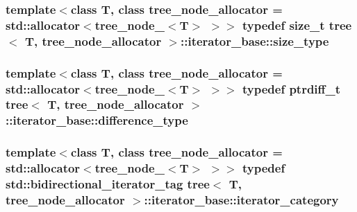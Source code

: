 \hypertarget{classtree_1_1iterator__base_a2b239ac4db713d5b191e696584a9076}{
\subsubsection{\setlength{\rightskip}{0pt plus 5cm}template$<$class T, class tree\_\-node\_\-allocator = std::allocator$<$tree\_\-node\_\-$<$T$>$ $>$$>$ typedef size\_\-t {\bf tree}$<$ T, tree\_\-node\_\-allocator $>$::{\bf iterator\_\-base::size\_\-type}}}
\label{classtree_1_1iterator__base_a2b239ac4db713d5b191e696584a9076}


\hypertarget{classtree_1_1iterator__base_eff66472181aa05d50c7ffe4a91dc4c0}{
\subsubsection{\setlength{\rightskip}{0pt plus 5cm}template$<$class T, class tree\_\-node\_\-allocator = std::allocator$<$tree\_\-node\_\-$<$T$>$ $>$$>$ typedef ptrdiff\_\-t {\bf tree}$<$ T, tree\_\-node\_\-allocator $>$::{\bf iterator\_\-base::difference\_\-type}}}
\label{classtree_1_1iterator__base_eff66472181aa05d50c7ffe4a91dc4c0}


\hypertarget{classtree_1_1iterator__base_7d0ace14418254eaab7526f1d0aabf40}{
\subsubsection{\setlength{\rightskip}{0pt plus 5cm}template$<$class T, class tree\_\-node\_\-allocator = std::allocator$<$tree\_\-node\_\-$<$T$>$ $>$$>$ typedef std::bidirectional\_\-iterator\_\-tag {\bf tree}$<$ T, tree\_\-node\_\-allocator $>$::{\bf iterator\_\-base::iterator\_\-category}}}
\label{classtree_1_1iterator__base_7d0ace14418254eaab7526f1d0aabf40}




